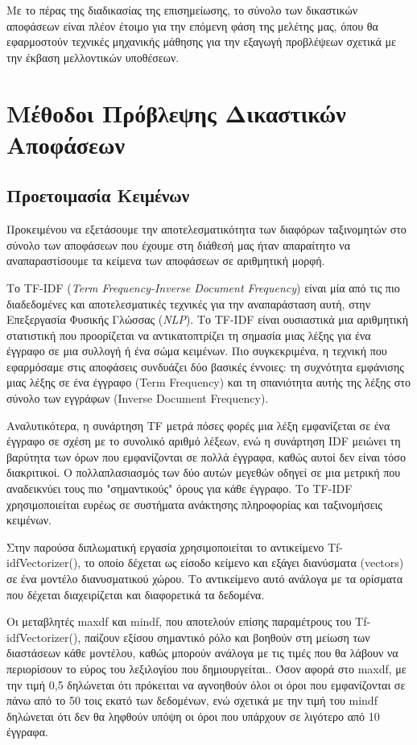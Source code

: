 \documentclass[diploma]{softlab-thesis}
\begin{document}
\begin{enumerate}
\begin{enumerate}
Με το πέρας της διαδικασίας της επισημείωσης, το σύνολο των δικαστικών αποφάσεων είναι πλέον έτοιμο για την επόμενη φάση της μελέτης μας, όπου θα εφαρμοστούν τεχνικές μηχανικής μάθησης για την εξαγωγή προβλέψεων σχετικά με την έκβαση μελλοντικών υποθέσεων.

 
\chapter{Μέθοδοι Πρόβλεψης Δικαστικών Αποφάσεων}


\section{Προετοιμασία Κειμένων}

Προκειμένου να εξετάσουμε την αποτελεσματικότητα των διαφόρων ταξινομητών στο σύνολο των αποφάσεων που έχουμε στη διάθεσή μας ήταν απαραίτητο να αναπαραστίσουμε τα κείμενα των αποφάσεων σε αριθμητική μορφή.

Το TF-IDF (\textit{Term Frequency-Inverse Document Frequency}) είναι μία από τις πιο διαδεδομένες και αποτελεσματικές τεχνικές για την αναπαράσταση αυτή, στην Επεξεργασία Φυσικής Γλώσσας (\textit{NLP}). Το TF-IDF είναι ουσιαστικά μια αριθμητική στατιστική που προορίζεται να αντικατοπτρίζει τη σημασία μιας λέξης για ένα έγγραφο σε μια συλλογή ή ένα σώμα κειμένων. Πιο συγκεκριμένα, η τεχνική που εφαρμόσαμε στις αποφάσεις συνδυάζει δύο βασικές έννοιες: τη συχνότητα εμφάνισης μιας λέξης σε ένα έγγραφο (Term Frequency) και τη σπανιότητα αυτής της λέξης στο σύνολο των εγγράφων (Inverse Document Frequency).

Αναλυτικότερα, η συνάρτηση TF μετρά πόσες φορές μια λέξη εμφανίζεται σε ένα έγγραφο σε σχέση με το συνολικό αριθμό λέξεων, ενώ η συνάρτηση IDF μειώνει τη βαρύτητα των όρων που εμφανίζονται σε πολλά έγγραφα, καθώς αυτοί δεν είναι τόσο διακριτικοί. Ο πολλαπλασιασμός των δύο αυτών μεγεθών οδηγεί σε μια μετρική που αναδεικνύει τους πιο "σημαντικούς" όρους για κάθε έγγραφο. Το TF-IDF χρησιμοποιείται ευρέως σε συστήματα ανάκτησης πληροφορίας και ταξινομήσεις κειμένων.

Στην παρούσα διπλωματική εργασία χρησιμοποιείται το αντικείμενο Tf-idfVectorizer(), το οποίο δέχεται ως είσοδο κείμενο και εξάγει διανύσματα (vectors) σε ένα μοντέλο διανυσματικού χώρου. Το αντικείμενο αυτό ανάλογα με τα ορίσματα που δέχεται διαχειρίζεται και διαφορετικά τα δεδομένα. 

Οι μεταβλητές maxdf και mindf, που αποτελούν επίσης παραμέτρους του Tf-idfVectorizer(), παίζουν εξίσου σημαντικό ρόλο και βοηθούν στη μείωση των διαστάσεων κάθε μοντέλου, καθώς μπορούν ανάλογα με τις τιμές που θα λάβουν να περιορίσουν το εύρος του λεξιλογίου που δημιουργείται.. Όσον αφορά στο maxdf, με την τιμή 0,5 δηλώνεται ότι πρόκειται να αγνοηθούν όλοι οι όροι που εμφανίζονται σε πάνω από το 50 τοις εκατό των δεδομένων, ενώ σχετικά με την τιμή του mindf δηλώνεται ότι δεν θα ληφθούν υπόψη οι όροι που υπάρχουν σε λιγότερο από 10 έγγραφα.


\end{enumerate}
\end{enumerate}
\end{document}
